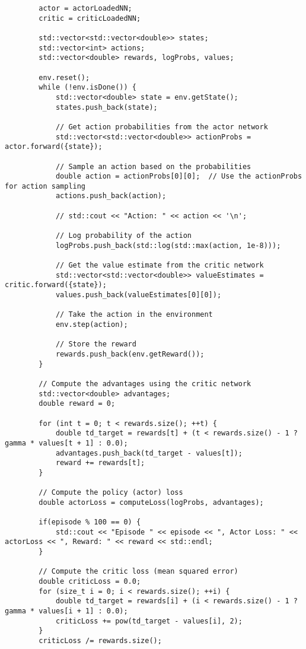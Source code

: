 \begin{verbatim}
        actor = actorLoadedNN;
        critic = criticLoadedNN;

        std::vector<std::vector<double>> states;
        std::vector<int> actions;
        std::vector<double> rewards, logProbs, values;

        env.reset();
        while (!env.isDone()) {
            std::vector<double> state = env.getState();
            states.push_back(state);

            // Get action probabilities from the actor network
            std::vector<std::vector<double>> actionProbs = actor.forward({state});

            // Sample an action based on the probabilities
            double action = actionProbs[0][0];  // Use the actionProbs for action sampling
            actions.push_back(action);

            // std::cout << "Action: " << action << '\n';
            
            // Log probability of the action
            logProbs.push_back(std::log(std::max(action, 1e-8)));

            // Get the value estimate from the critic network
            std::vector<std::vector<double>> valueEstimates = critic.forward({state});
            values.push_back(valueEstimates[0][0]);

            // Take the action in the environment
            env.step(action);

            // Store the reward
            rewards.push_back(env.getReward());
        }

        // Compute the advantages using the critic network
        std::vector<double> advantages;
        double reward = 0;

        for (int t = 0; t < rewards.size(); ++t) {
            double td_target = rewards[t] + (t < rewards.size() - 1 ? gamma * values[t + 1] : 0.0);
            advantages.push_back(td_target - values[t]);
            reward += rewards[t];
        }

        // Compute the policy (actor) loss
        double actorLoss = computeLoss(logProbs, advantages);

        if(episode % 100 == 0) {
            std::cout << "Episode " << episode << ", Actor Loss: " << actorLoss << ", Reward: " << reward << std::endl;
        }

        // Compute the critic loss (mean squared error)
        double criticLoss = 0.0;
        for (size_t i = 0; i < rewards.size(); ++i) {
            double td_target = rewards[i] + (i < rewards.size() - 1 ? gamma * values[i + 1] : 0.0);
            criticLoss += pow(td_target - values[i], 2);
        }
        criticLoss /= rewards.size();


\end{verbatim}
